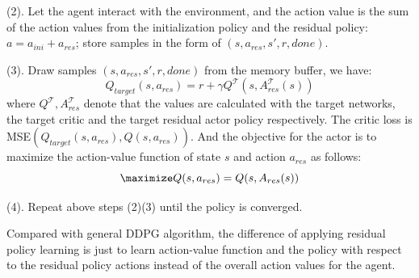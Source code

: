 \documentclass{article}
\begin{document}
(2). Let the agent interact with the environment, and the action value is the sum of the action values from the initialization policy and the residual policy: $a=a_{ini}+a_{res}$; store samples in the form of $(s,a_{res}, s', r, done)$.

(3). Draw samples $(s,a_{res}, s', r, done)$ from the memory buffer, we have:
\begin{equation}
    Q_{target}(s,a_{res})=r+\gamma Q^{\mathcal{T}}(s, A_{res}^{\mathcal{T}}(s))
\end{equation}
where $Q^{\mathcal{T}}, A_{res}^{\mathcal{T}}$ denote that the values are calculated with the target networks, the target critic and the target residual actor policy respectively. The critic loss is MSE$(Q_{target}(s,a_{res}), Q(s,a_{res}))$. And the objective for the actor is to maximize the action-value function of state $s$ and action $a_{res}$ as follows:
\begin{equation}
\maximize Q(s,a_{res})=Q(s,A_{res}(s))
\end{equation}

(4). Repeat above steps (2)(3) until the policy is converged.

Compared with general DDPG algorithm, the difference of applying residual policy learning is just to learn action-value function and the policy with respect to the residual policy actions instead of the overall action values for the agent.
\end{document}
